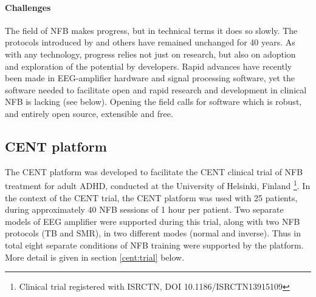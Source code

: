 \documentclass[fleqn,10pt]{wlpeerj}
\begin{document}
\paragraph{Challenges}
The field of NFB makes progress, but in technical terms it does so slowly. The protocols introduced by \cite{Lubar1976} and others have remained unchanged for 40 years. As with any technology, progress relies not just on research, but also on adoption and exploration of the potential by developers. Rapid advances have recently been made in EEG-amplifier hardware and signal processing software, yet the software needed to facilitate open and rapid research and development in clinical NFB is lacking (see below). Opening the field calls for software which is robust, and entirely open source, extensible and free.





%
%
%
%
%



\subsection{CENT platform}

The CENT platform was developed to facilitate the CENT clinical trial of NFB treatment for adult ADHD, conducted at the University of Helsinki, Finland \footnote{Clinical trial registered with ISRCTN, DOI 10.1186/ISRCTN13915109}. In the context of the CENT trial, the CENT platform was used with 25 patients, during approximately 40 NFB sessions of 1 hour per patient. Two separate models of EEG amplifier were supported during this trial, along with two NFB protocols (TB and SMR), in two different modes (normal and inverse).  Thus in total eight separate conditions of NFB training were supported by the platform. More detail is given in section \ref{cent:trial} below.
\end{document}
